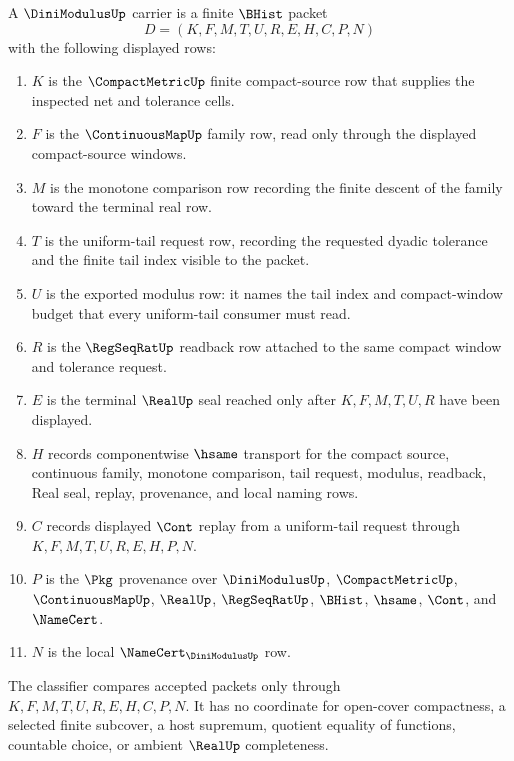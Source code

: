\begin{definition}
\label{def:dini-modulus-carrier}
A $\DiniModulusUp$ carrier is a finite $\BHist$ packet
$$
D=(K,F,M,T,U,R,E,H,C,P,N)
$$
with the following displayed rows:
\begin{enumerate}
\item $K$ is the $\CompactMetricUp$ finite compact-source row that supplies the inspected net and tolerance cells.
\item $F$ is the $\ContinuousMapUp$ family row, read only through the displayed compact-source windows.
\item $M$ is the monotone comparison row recording the finite descent of the family toward the terminal real row.
\item $T$ is the uniform-tail request row, recording the requested dyadic tolerance and the finite tail index visible to the packet.
\item $U$ is the exported modulus row: it names the tail index and compact-window budget that every uniform-tail consumer must read.
\item $R$ is the $\RegSeqRatUp$ readback row attached to the same compact window and tolerance request.
\item $E$ is the terminal $\RealUp$ seal reached only after $K,F,M,T,U,R$ have been displayed.
\item $H$ records componentwise $\hsame$ transport for the compact source, continuous family, monotone comparison, tail request, modulus, readback, Real seal, replay, provenance, and local naming rows.
\item $C$ records displayed $\Cont$ replay from a uniform-tail request through $K,F,M,T,U,R,E,H,P,N$.
\item $P$ is the $\Pkg$ provenance over $\DiniModulusUp$, $\CompactMetricUp$, $\ContinuousMapUp$, $\RealUp$, $\RegSeqRatUp$, $\BHist$, $\hsame$, $\Cont$, and $\NameCert$.
\item $N$ is the local $\NameCert_{\DiniModulusUp}$ row.
\end{enumerate}
The classifier compares accepted packets only through $K,F,M,T,U,R,E,H,C,P,N$. It has no coordinate for open-cover compactness, a selected finite subcover, a host supremum, quotient equality of functions, countable choice, or ambient $\RealUp$ completeness.
\end{definition}

